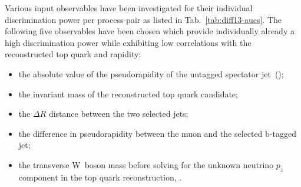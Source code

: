 Various input observables have been investigated for their individual discrimination power per process-pair as listed in Tab.~\ref{tab:diff13-aucs}. The following five observables have been chosen which provide individually already a high discrimination power while exhibiting low correlations with the reconstructed top quark \pt and rapidity:

\begin{itemize}
\item the absolute value of the pseudorapidity of the untagged spectator jet~(\jprime);
\item the invariant mass of the reconstructed top quark candidate;
\item the $\Delta R$ distance between the two selected jets;
\item the difference in pseudorapidity between the muon and the selected b-tagged jet;
\item the transverse W~boson mass before solving for the unknown neutrino $p_{z}$ component in the top quark reconstruction, \mtw.
\end{itemize} 

